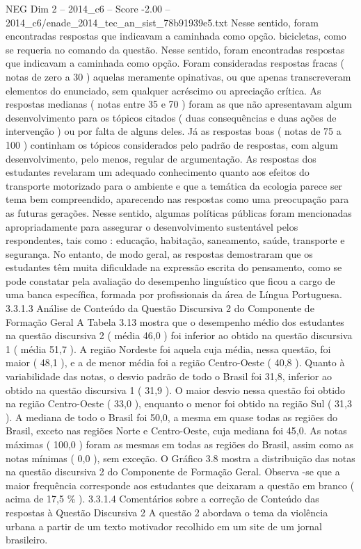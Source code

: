 \begin{textsample}{NEG Dim 2 – 2014\_c6 – Score -2.00 – 2014\_c6/enade\_2014\_tec\_an\_sist\_78b91939e5.txt}
Nesse sentido, foram encontradas respostas que indicavam a caminhada como opção. bicicletas, como se requeria no comando da questão.
Nesse sentido, foram encontradas respostas que indicavam a caminhada como opção.
Foram consideradas respostas fracas ( notas de zero a 30 ) aquelas meramente opinativas, ou que apenas transcreveram elementos do enunciado, sem qualquer acréscimo ou apreciação crítica.
As respostas medianas ( notas entre 35 e 70 ) foram as que não apresentavam algum desenvolvimento para os tópicos citados ( duas consequências e duas ações de intervenção ) ou por falta de alguns deles.
Já as respostas boas ( notas de 75 a 100 ) continham os tópicos considerados pelo padrão de respostas, com algum desenvolvimento, pelo menos, regular de argumentação.
As respostas dos estudantes revelaram um adequado conhecimento quanto aos efeitos do transporte motorizado para o ambiente e que a temática da ecologia parece ser tema bem compreendido, aparecendo nas respostas como uma preocupação para as futuras gerações.
Nesse sentido, algumas políticas públicas foram mencionadas apropriadamente para assegurar o desenvolvimento sustentável pelos respondentes, tais como : educação, habitação, saneamento, saúde, transporte e segurança.
No entanto, de modo geral, as respostas demostraram que os estudantes têm muita dificuldade na expressão escrita do pensamento, como se pode constatar pela avaliação do desempenho linguístico que ficou a cargo de uma banca específica, formada por profissionais da área de Língua Portuguesa. 3.3.1.3 Análise de Conteúdo da Questão Discursiva 2 do Componente de Formação Geral A Tabela 3.13 mostra que o desempenho médio dos estudantes na questão discursiva 2 ( média 46,0 ) foi inferior ao obtido na questão discursiva 1 ( média 51,7 ).
A região Nordeste foi aquela cuja média, nessa questão, foi maior ( 48,1 ), e a de menor média foi a região Centro-Oeste ( 40,8 ).
Quanto à variabilidade das notas, o desvio padrão de todo o Brasil foi 31,8, inferior ao obtido na questão discursiva 1 ( 31,9 ).
O maior desvio nessa questão foi obtido na região Centro-Oeste ( 33,0 ), enquanto o menor foi obtido na região Sul ( 31,3 ).
A mediana de todo o Brasil foi 50,0, a mesma em quase todas as regiões do Brasil, exceto nas regiões Norte e Centro-Oeste, cuja mediana foi 45,0.
As notas máximas ( 100,0 ) foram as mesmas em todas as regiões do Brasil, assim como as notas mínimas ( 0,0 ), sem exceção.
O Gráfico 3.8 mostra a distribuição das notas na questão discursiva 2 do Componente de Formação Geral.
Observa -se que a maior frequência corresponde aos estudantes que deixaram a questão em branco ( acima de 17,5 \% ). 3.3.1.4 Comentários sobre a correção de Conteúdo das respostas à Questão Discursiva 2 A questão 2 abordava o tema da violência urbana a partir de um texto motivador recolhido em um site de um jornal brasileiro.

\end{textsample}
